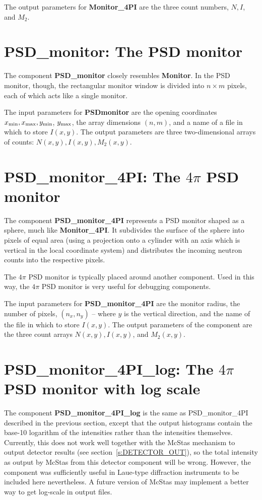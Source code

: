 The output parameters for {\bf Monitor\_4PI} are the three count numbers, $N, I$, and $M_2$.

\section{PSD\_monitor: The PSD monitor}
The component {\bf PSD\_monitor} closely resembles 
{\bf Monitor}.
In the PSD monitor, though, the rectangular monitor window is divided
into $n \times m$ pixels, each of which acts like a single
monitor.

The input parameters for {\bf PSD\-monitor} are
the opening coordinates $x_{\rm min}, x_{\rm max}, y_{\rm min}$, 
$y_{\rm max}$, the array dimensions $(n,m)$, and a name of a file in
which to store $I(x,y)$.
The output parameters are three two-dimensional arrays 
of counts: $N(x,y), I(x,y), M_2(x,y)$.

\section{PSD\_monitor\_4PI: The $4\pi$ PSD monitor}
The component {\bf PSD\_monitor\_4PI} represents 
a PSD monitor shaped as a sphere, much like {\bf Monitor\_4PI}.
It subdivides the surface of the sphere into pixels of equal 
area (using a projection onto a cylinder with an axis
which is vertical in the local coordinate system) 
and distributes the incoming neutron counts into the respective pixels.

The $4\pi$ PSD monitor is typically placed
around another component. Used in this way, 
the $4\pi$ PSD monitor is very useful for debugging components.

The input parameters for {\bf PSD\_monitor\_4PI} are
the monitor radius, the number of pixels, $(n_x, n_y)$ -- where
$y$ is the vertical direction, and the name of the file in which
to store $I(x,y)$. 
The output parameters of the component are the three count arrays
$N(x,y), I(x,y)$, and $M_2(x,y)$. 


\section{PSD\_monitor\_4PI\_log: The $4\pi$ PSD monitor with log scale}

The component {\bf PSD\_monitor\_4PI\_log} is the same as PSD\_monitor\_4PI
described in the previous section, except that the output histograms
contain the base-10 logarithm of the intensities rather than the
intensities themselves. Currently, this does not work well together with
the McStas mechanism to output detector results (see section~\ref{s:DETECTOR_OUT}), so
the total intensity as output by McStas from this detector component
will be wrong. However, the component was sufficiently useful in
Laue-type diffraction instruments to be included here nevertheless. A
future version of McStas may implement a better way to get log-scale in
output files.


